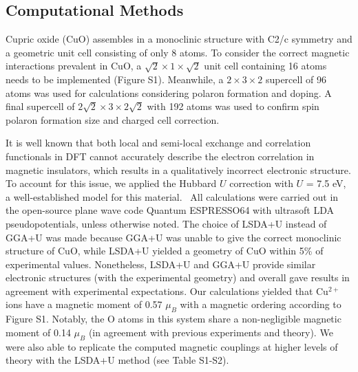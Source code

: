 \subsection{Computational Methods}
Cupric oxide (CuO) assembles in a monoclinic structure with C2/c symmetry and a geometric unit cell consisting of only 8 atoms. To consider the correct magnetic interactions prevalent in CuO, a $\sqrt{2}\times 1\times \sqrt{2}$ unit cell containing 16 atoms needs to be implemented (Figure S1).\cite{rocquefelte2012theoretical,yang1989magnetic,forsyth1988magnetism} Meanwhile, a $2\times 3\times 2$ supercell of 96 atoms was used for calculations considering polaron formation and doping. A final supercell of $2\sqrt{2}\times 3\times 2\sqrt{2}$ with 192 atoms was used to confirm spin polaron formation size and charged cell correction.

It is well known that both local and semi-local exchange and correlation functionals in DFT cannot accurately describe the electron correlation in magnetic insulators, which results in a qualitatively incorrect electronic structure. To account for this issue, we applied the Hubbard $U$ correction\cite{dudarev1998electron} with $U$ = 7.5 eV, a well-established model for this material.~\cite{peng2012density,peng2014ab,heinemann2013band,debbichi2012vibrational,wu2006lsda} All calculations were carried out in the open-source plane wave code Quantum ESPRESSO64 with ultrasoft LDA pseudopotentials,\cite{gbrv} unless otherwise noted. The choice of LSDA+U instead of GGA+U was made because GGA+U was unable to give the correct monoclinic structure of CuO, while LSDA+U yielded a geometry of CuO within 5\% of experimental values. Nonetheless, LSDA+U and GGA+U provide similar electronic structures (with the experimental geometry) and overall gave results in agreement with experimental expectations.  Our calculations yielded that Cu$^{2+}$ ions have a magnetic moment of 0.57 $\mu_B$ with a magnetic ordering according to Figure S1. Notably, the O atoms in this system share a non-negligible magnetic moment of 0.14 $\mu_B$ (in agreement with previous experiments\cite{forsyth1988magnetism} and theory\cite{peng2012density}). We were also able to replicate the computed magnetic couplings at higher levels of theory with the LSDA+U method (see Table S1-S2).

